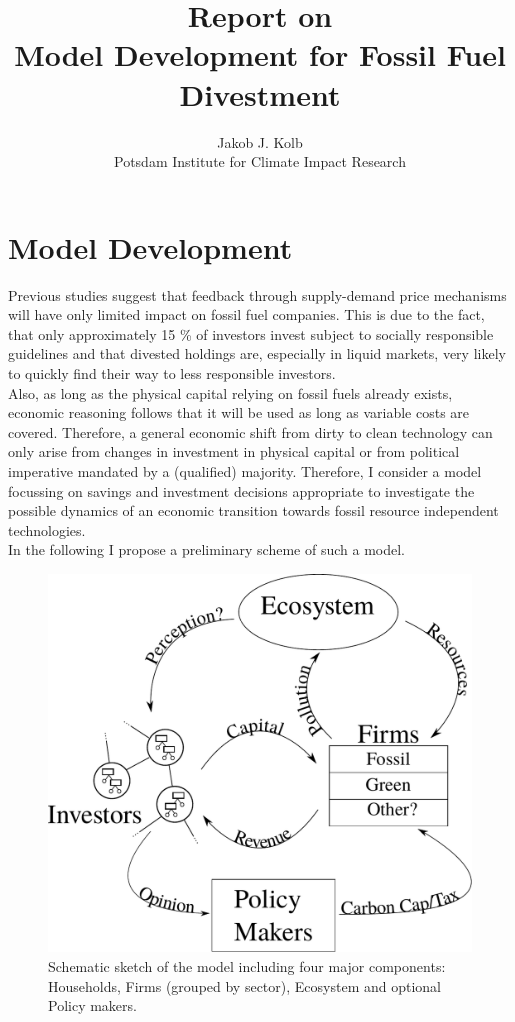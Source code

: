 \title{Report on \\ Model Development for Fossil Fuel Divestment}
\author{Jakob J. Kolb \\ Potsdam Institute for Climate Impact Research}

\maketitle

\section{Model Development} 

Previous studies \cite{Ans2013} suggest that feedback through supply-demand price mechanisms will have only limited impact on fossil fuel companies. This is due to the fact, that only approximately 15 \% of investors invest subject to socially responsible guidelines \cite{SIF2014Report} and that divested holdings are, especially in liquid markets, very likely to quickly find their way to less responsible investors. \\
Also, as long as the physical capital relying on fossil fuels already exists, economic reasoning follows that it will be used as long as variable costs are covered.
Therefore, a general economic shift from dirty to clean technology can only arise from changes in investment in physical capital or from political imperative mandated by a (qualified) majority. Therefore, I consider a model focussing on savings and investment decisions appropriate to investigate the possible dynamics of an economic transition towards fossil resource independent technologies.\\
In the following I propose a preliminary scheme of such a model.

\begin{figure}[h]
	\centering
	\includegraphics[width =.7 \textwidth]{figures/Model_Scheme.pdf}
	\caption{Schematic sketch of the model including four major components: Households, Firms (grouped by sector), Ecosystem and optional Policy makers.}
	\label{fig:model}
\end{figure}

